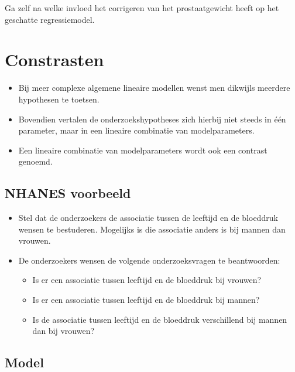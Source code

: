 \documentclass[
  12pt,dutch,coursenotes]{book}
\providecommand{\tightlist}{%
  \setlength{\itemsep}{0pt}\setlength{\parskip}{0pt}}
\theoremstyle{definition}
\theoremstyle{definition}
\theoremstyle{definition}
\theoremstyle{remark}
\begin{document}
Ga zelf na welke invloed het corrigeren van het prostaatgewicht heeft op het geschatte regressiemodel.

\hypertarget{constrasten}{%
\section{Constrasten}\label{constrasten}}

\begin{itemize}
\tightlist
\item
  Bij meer complexe algemene lineaire modellen wenst men dikwijls meerdere hypothesen te toetsen.
\item
  Bovendien vertalen de onderzoekshypotheses zich hierbij niet steeds in één parameter, maar in een lineaire combinatie van modelparameters.
\item
  Een lineaire combinatie van modelparameters wordt ook een contrast genoemd.
\end{itemize}

\hypertarget{nhanes-voorbeeld-1}{%
\subsection{NHANES voorbeeld}\label{nhanes-voorbeeld-1}}

\begin{itemize}
\item
  Stel dat de onderzoekers de associatie tussen de leeftijd en de bloeddruk wensen te bestuderen. Mogelijks is die associatie anders is bij mannen dan vrouwen.
\item
  De onderzoekers wensen de volgende onderzoeksvragen te beantwoorden:

  \begin{itemize}
  \tightlist
  \item
    Is er een associatie tussen leeftijd en de bloeddruk bij vrouwen?
  \item
    Is er een associatie tussen leeftijd en de bloeddruk bij mannen?
  \item
    Is de associatie tussen leeftijd en de bloeddruk verschillend bij mannen dan bij vrouwen?
  \end{itemize}
\end{itemize}

\hypertarget{model-3}{%
\subsection{Model}\label{model-3}}
\end{document}
